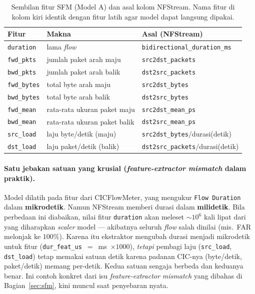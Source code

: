 \documentclass[11pt,a4paper]{article}
\begin{document}
\begin{table}[h]
\centering
\caption{Sembilan fitur SFM (Model A) dan asal kolom NFStream. Nama fitur di
kolom kiri identik dengan fitur latih agar model dapat langsung dipakai.}
\label{tab:9feat}
\small
\begin{tabular}{lll}
\toprule
Fitur & Makna & Asal (NFStream) \\
\midrule
\texttt{duration}  & lama \emph{flow} & \texttt{bidirectional\_duration\_ms} \\
\texttt{fwd\_pkts}  & jumlah paket arah maju & \texttt{src2dst\_packets} \\
\texttt{bwd\_pkts}  & jumlah paket arah balik & \texttt{dst2src\_packets} \\
\texttt{fwd\_bytes} & total byte arah maju & \texttt{src2dst\_bytes} \\
\texttt{bwd\_bytes} & total byte arah balik & \texttt{dst2src\_bytes} \\
\texttt{fwd\_mean}  & rata-rata ukuran paket maju & \texttt{src2dst\_mean\_ps} \\
\texttt{bwd\_mean}  & rata-rata ukuran paket balik & \texttt{dst2src\_mean\_ps} \\
\texttt{src\_load}  & laju byte/detik (maju) & \texttt{src2dst\_bytes}$/$durasi(detik) \\
\texttt{dst\_load}  & laju paket/detik (balik) & \texttt{dst2src\_packets}$/$durasi(detik) \\
\bottomrule
\end{tabular}
\end{table}

\paragraph{Satu jebakan satuan yang krusial (\emph{feature-extractor mismatch}
dalam praktik).} Model dilatih pada fitur dari CICFlowMeter, yang mengukur
\texttt{Flow Duration} dalam \textbf{mikrodetik}. Namun NFStream memberi durasi
dalam \textbf{milidetik}. Bila perbedaan ini diabaikan, nilai fitur
\texttt{duration} akan meleset $\sim$$10^6$ kali lipat dari yang diharapkan
\emph{scaler} model --- akibatnya seluruh \emph{flow} salah dinilai (mis.\ FAR
melonjak ke $100\%$). Karena itu ekstraktor mengubah durasi menjadi mikrodetik
untuk fitur (\texttt{dur\_feat\_us}~$=$~ms~$\times 1000$), \emph{tetapi} pembagi
laju (\texttt{src\_load}, \texttt{dst\_load}) tetap memakai satuan detik karena
padanan CIC-nya (byte/detik, paket/detik) memang per-detik. Kedua satuan sengaja
berbeda dan keduanya benar. Ini contoh konkret dari isu \emph{feature-extractor
mismatch} yang dibahas di Bagian~\ref{sec:sfm}, kini muncul saat penyebaran nyata.
\end{document}
